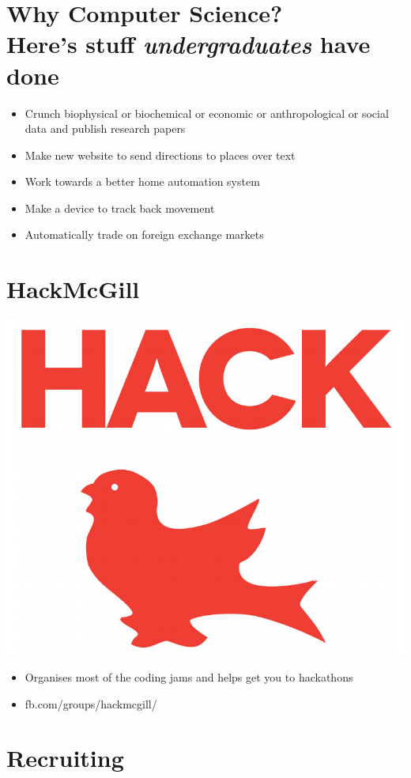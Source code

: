 \section{Why Computer Science?  \\ Here's stuff \textit{undergraduates} have done}

\begin{itemize}
	\item Crunch biophysical or biochemical or economic or anthropological or social data and publish research papers
	\item Make new website to send directions to places over text
	\item Work towards a better home automation system
	\item Make a device to track back movement
	\item Automatically trade on foreign exchange markets
\end{itemize}

\clearpage


\section{HackMcGill}
\begin{multicols}{2}
	\includegraphics[width=.45\textwidth]{gfx/HackMcGilllogo.png}
\begin{itemize}
	\item Organises most of the coding jams and helps get you to hackathons
	\item fb.com/groups/hackmcgill/
\end{itemize}
\end{multicols}
\clearpage


\section{Recruiting}

